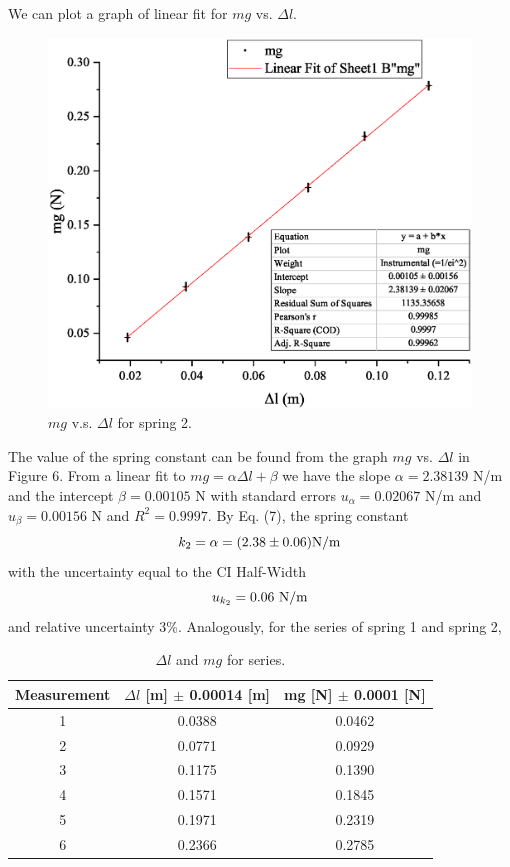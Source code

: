 \documentclass[a4paper]{report}
\begin{document}
	We can plot a graph of linear fit for $mg$ vs. $\Delta l$.
	\begin{figure}[H]
		\centering
		\includegraphics[width=1\linewidth]{6.eps}
		\caption{$mg$ v.s. $\Delta l$ for spring 2.}
	\end{figure}
	The value of the spring constant can be found from the graph $mg$ vs. $\Delta l$ in Figure 6. From a linear fit to $mg=\alpha\Delta l+\beta$ we have the slope $\alpha=2.38139$ N/m and the intercept $\beta=0.00105$ N with standard errors $u_{\alpha}=0.02067$ N/m and $u_{\beta}=0.00156$ N and $R^2=0.9997$. By Eq. (7), the spring constant
	\begin{equation*}
	k_2=\alpha=(2.38\pm0.06)\rm{N/m}
	\end{equation*}
	with the uncertainty equal to the CI Half-Width
	\begin{equation*}
	u_{k_2}=0.06\ \rm{N/m}
	\end{equation*}
	and relative uncertainty 3\%.
	Analogously, for the series of spring 1 and spring 2,
	\begin{table}[H]
		\centering
		\begin{tabular}{|c|c|c|}
			\hline
			Measurement&$\Delta l$ [m] $\pm$ 0.00014 [m]&mg [N] $\pm$ 0.0001 [N]\\
			\hline
			1&0.0388&0.0462\\
			\hline
			2&0.0771&0.0929\\
			\hline
			3&0.1175&0.1390\\
			\hline
			4&0.1571&0.1845\\
			\hline
			5&0.1971&0.2319\\
			\hline
			6&0.2366&0.2785\\
			\hline
		\end{tabular}
		\caption{$\Delta l$ and $mg$ for series.}
	\end{table}
\end{document}
